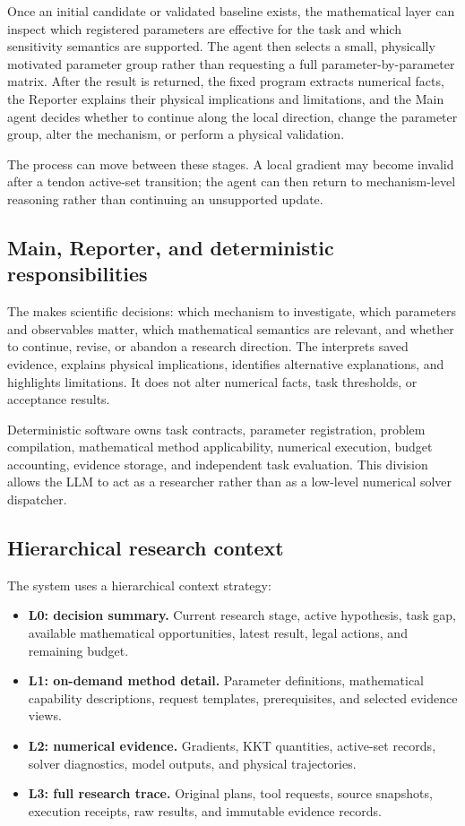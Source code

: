 Once an initial candidate or validated baseline exists, the mathematical layer can inspect which registered parameters are effective for the task and which sensitivity semantics are supported. The agent then selects a small, physically motivated parameter group rather than requesting a full parameter-by-parameter matrix. After the result is returned, the fixed program extracts numerical facts, the Reporter explains their physical implications and limitations, and the Main agent decides whether to continue along the local direction, change the parameter group, alter the mechanism, or perform a physical validation.

The process can move between these stages. A local gradient may become invalid after a tendon active-set transition; the agent can then return to mechanism-level reasoning rather than continuing an unsupported update.

\subsection{Main, Reporter, and deterministic responsibilities}

The \MainAgent{} makes scientific decisions: which mechanism to investigate, which parameters and observables matter, which mathematical semantics are relevant, and whether to continue, revise, or abandon a research direction. The \Reporter{} interprets saved evidence, explains physical implications, identifies alternative explanations, and highlights limitations. It does not alter numerical facts, task thresholds, or acceptance results.

Deterministic software owns task contracts, parameter registration, problem compilation, mathematical method applicability, numerical execution, budget accounting, evidence storage, and independent task evaluation. This division allows the LLM to act as a researcher rather than as a low-level numerical solver dispatcher.

\subsection{Hierarchical research context}

The system uses a hierarchical context strategy:
\begin{itemize}
  \item \textbf{L0: decision summary.} Current research stage, active hypothesis, task gap, available mathematical opportunities, latest result, legal actions, and remaining budget.
  \item \textbf{L1: on-demand method detail.} Parameter definitions, mathematical capability descriptions, request templates, prerequisites, and selected evidence views.
  \item \textbf{L2: numerical evidence.} Gradients, KKT quantities, active-set records, solver diagnostics, model outputs, and physical trajectories.
  \item \textbf{L3: full research trace.} Original plans, tool requests, source snapshots, execution receipts, raw results, and immutable evidence records.
\end{itemize}

